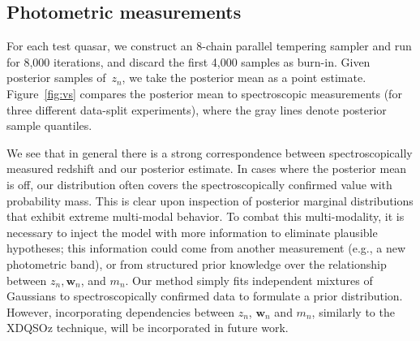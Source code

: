 \documentclass{article} %
\begin{document}
\subsection{Photometric measurements}
For each test quasar, we construct an 8-chain parallel tempering sampler and run for 8,000 iterations, and discard the first 4,000 samples as burn-in. 
Given posterior samples of~$z_n$, we take the posterior mean as a point estimate.  
Figure~\ref{fig:vs} compares the posterior mean to spectroscopic measurements (for three different data-split experiments), where the gray lines denote posterior sample quantiles. 

We see that in general there is a strong correspondence between spectroscopically measured redshift and our posterior estimate.
In cases where the posterior mean is off, our distribution often covers the spectroscopically confirmed value with probability mass.
This is clear upon inspection of posterior marginal distributions that exhibit extreme multi-modal behavior.  
To combat this multi-modality, it is necessary to inject the model with more information to eliminate plausible hypotheses; this information could come from another measurement (e.g., a new photometric band), or from structured prior knowledge over the relationship between $z_n, \mathbf{w}_n$, and $m_n$.  Our method simply fits independent mixtures of Gaussians to spectroscopically confirmed data to formulate a prior distribution.  However, incorporating dependencies between $z_n$, $\mathbf{w}_n$ and $m_n$, similarly to the XDQSOz technique, will be incorporated in future work. 
\end{document}
